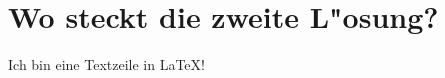 \chapter{Wo steckt die zweite L"osung?\label{chapter:thema}}
\begin{refsection}

Ich bin eine Textzeile in \LaTeX{}!
\printbibliography[heading=subbibliography]
\end{refsection}

